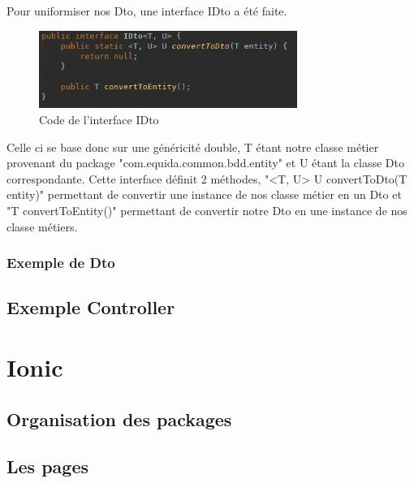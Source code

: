 				Pour uniformiser nos Dto, une interface IDto a été faite.

				\begin{figure}[H]
					\centering\includegraphics[width=0.75\textwidth, keepaspectratio]{res/idto.png}
					\caption{Code de l'interface IDto}
				\end{figure}

				Celle ci se base donc sur une généricité double, T étant notre classe métier provenant du package "com.equida.common.bdd.entity" et U étant la classe Dto correspondante. Cette interface définit 2 méthodes, "<T, U> U convertToDto(T entity)" permettant de convertir une instance de nos classe métier en un Dto et "T convertToEntity()" permettant de convertir notre Dto en une instance de nos classe métiers.

			\subsubsection{Exemple de Dto}


		\subsection{Exemple Controller}


	\section{Ionic}

		\subsection{Organisation des packages}


		\subsection{Les pages}


